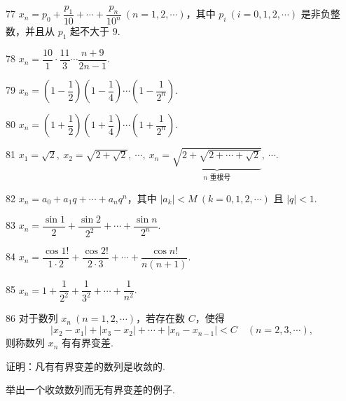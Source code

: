
\begin{prob}[M]{77}
$x_n = p_0 + \dfrac{p_1}{10} + \cdots + \dfrac{p_n}{10^n}\ (n=1,2,\cdots)$，其中 $p_i\ (i=0,1,2,\cdots)$ 是非负整数，并且从 $p_1$ 起不大于 $9$.
\end{prob}

\begin{prob}[M]{78}
$x_n = \dfrac{10}{1}\cdot\dfrac{11}{3}\cdots\dfrac{n+9}{2n-1}$.
\end{prob}

\begin{prob}[M]{79}
$x_n = \left(1 - \dfrac{1}{2}\right)\left(1 - \dfrac{1}{4}\right)\cdots\left(1 - \dfrac{1}{2^n}\right)$.
\end{prob}

\begin{prob}[M]{80}
$x_n = \left(1 + \dfrac{1}{2}\right)\left(1 + \dfrac{1}{4}\right)\cdots\left(1 + \dfrac{1}{2^n}\right)$.
\end{prob}

\begin{prob}[M]{81}
$x_1 = \sqrt{2},\ x_2 = \sqrt{2 + \sqrt{2}},\ \cdots,\ x_n = \underbrace{\sqrt{2 + \sqrt{2 + \cdots + \sqrt{2}}}}_{n\text{ 重根号}},\ \cdots$.
\end{prob}


\begin{prob}[M]{82}
$x_n = a_0 + a_1 q + \cdots + a_n q^n$，其中 $|a_k| < M\ (k=0,1,2,\cdots)$ 且 $|q| < 1$.
\end{prob}

\begin{prob}[M]{83}
$x_n = \dfrac{\sin 1}{2} + \dfrac{\sin 2}{2^2} + \cdots + \dfrac{\sin n}{2^n}$.
\end{prob}

\begin{prob}[M]{84}
$x_n = \dfrac{\cos 1!}{1\cdot 2} + \dfrac{\cos 2!}{2\cdot 3} + \cdots + \dfrac{\cos n!}{n(n+1)}$.
\end{prob}

\begin{prob}[M]{85}
$x_n = 1 + \dfrac{1}{2^2} + \dfrac{1}{3^2} + \cdots + \dfrac{1}{n^2}$.
\end{prob}

\begin{prob}[L]{86}
对于数列 $x_n\ (n=1,2,\cdots)$，若存在数 $C$，使得
\[
|x_2 - x_1| + |x_3 - x_2| + \cdots + |x_n - x_{n-1}| < C \quad (n=2,3,\cdots),
\]
则称数列 $x_n$ 有有界变差.

证明：凡有有界变差的数列是收敛的.

举出一个收敛数列而无有界变差的例子.
\end{prob}

